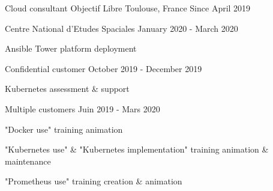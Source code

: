 

\begin{cventries}

  \cventry
    {Cloud consultant} %
    {Objectif Libre} %
    {Toulouse, France} %
    {Since April 2019} %
    {
      \begin{cvsubentries}
        \cvsubentry
          {}
          {Centre National d'Etudes Spaciales}
          {January 2020 - March 2020}
          {
            \begin{cvitems} %
              \item {Ansible Tower platform deployment}
            \end{cvitems}
          }
        \cvsubentry
          {}
          {Confidential customer}
          {October 2019 - December 2019}
          {
            \begin{cvitems} %
              \item {Kubernetes assessment \& support}
            \end{cvitems}
          }
        \cvsubentry
          {}
          {Multiple customers}
          {Juin 2019 - Mars 2020}
          {
            \begin{cvitems} %
              \item {"Docker use" training animation}
              \item {"Kubernetes use" \& "Kubernetes implementation" training animation \& maintenance}
              \item {"Prometheus use" training creation \& animation}
            \end{cvitems}
          }
      \end{cvsubentries}
    }
  

\end{cventries}
